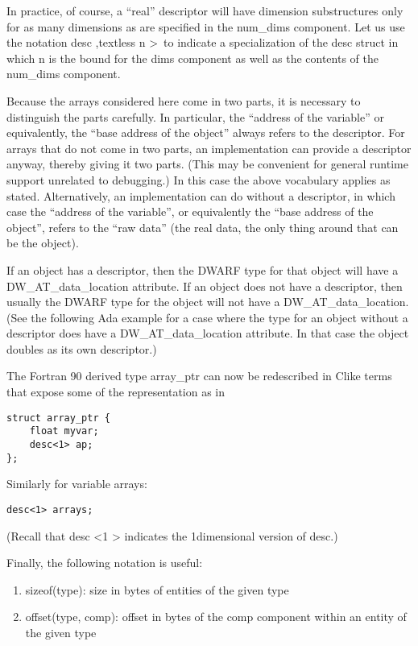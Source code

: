 In practice, of course, a “real” descriptor will have
dimension substructures only for as many dimensions as are
specified in the num\_dims component. Let us use the notation
desc ,textless n \textgreater\   
to indicate a specialization of the desc struct in
which n is the bound for the dims component as well as the
contents of the num\_dims component.

Because the arrays considered here come in two parts, it is
necessary to distinguish the parts carefully. In particular,
the “address of the variable” or equivalently, the “base
address of the object” always refers to the descriptor. For
arrays that do not come in two parts, an implementation can
provide a descriptor anyway, thereby giving it two parts. (This
may be convenient for general runtime support unrelated to
debugging.) In this case the above vocabulary applies as
stated. Alternatively, an implementation can do without a
descriptor, in which case the “address of the variable”,
or equivalently the “base address of the object”, refers
to the “raw data” (the real data, the only thing around
that can be the object).

If an object has a descriptor, then the DWARF type for that
object will have a DW\_AT\_data\_location attribute. If an object
does not have a descriptor, then usually the DWARF type for the
object will not have a DW\_AT\_data\_location. (See the following
Ada example for a case where the type for an object without
a descriptor does have a DW\_AT\_data\_location attribute. In
that case the object doubles as its own descriptor.)

The Fortran 90 derived type array\_ptr can now be redescribed
in C\dash like terms that expose some of the representation as in

\begin{lstlisting}
struct array_ptr {
    float myvar;
    desc<1> ap;
};
\end{lstlisting}

Similarly for variable arrays:
\begin{lstlisting}
desc<1> arrays;
\end{lstlisting}

(Recall that desc \textless 1 \textgreater 
indicates the 1\dash dimensional version of desc.)

Finally, the following notation is useful:

\begin{enumerate}[1.]
\item  sizeof(type): size in bytes of entities of the given type

\item offset(type, comp): offset in bytes of the comp component
within an entity of the given type
\end{enumerate}


